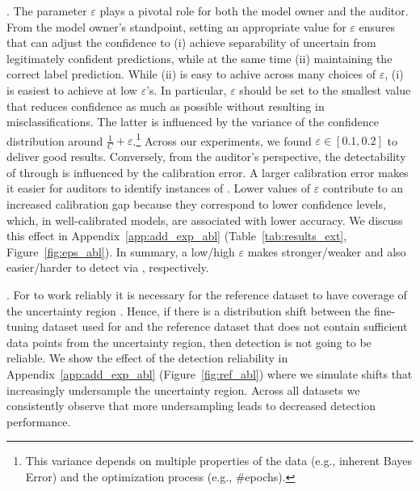 . The parameter $\varepsilon$ plays a pivotal role for both the model owner and the auditor. From the model owner's standpoint, setting an appropriate value for $\varepsilon$ ensures that \attack can adjust the confidence to (i) achieve separability of uncertain from legitimately confident predictions, while at the same time (ii) maintaining the correct label prediction. While (ii) is easy to achive across many choices of $\varepsilon$, (i) is easiest to achieve at low $\varepsilon$'s. In particular, $\varepsilon$ should be set to the smallest value that reduces confidence as much as possible without resulting in misclassifications. The latter is influenced by the variance of the confidence distribution around $\frac{1}{C} + \varepsilon$.\footnote{This variance depends on multiple properties of the data (e.g., inherent Bayes Error) and the optimization process (e.g., \#epochs).} Across our experiments, we found $\varepsilon \in [0.1,0.2]$ to deliver good results. Conversely, from the auditor's perspective, the detectability of \attack through \name is influenced by the calibration error. A larger calibration error makes it easier for auditors to identify instances of \attack. Lower values of $\varepsilon$ contribute to an increased calibration gap because they correspond to lower confidence levels, which, in well-calibrated models, are associated with lower accuracy. We discuss this effect in Appendix~\ref{app:add_exp_abl} (Table~\ref{tab:results_ext}, Figure~\ref{fig:eps_abl}). In summary, a low/high $\varepsilon$ makes \attack stronger/weaker and also easier/harder to detect via \name, respectively.


. For \name to work reliably it is necessary for the reference dataset to have coverage of the uncertainty region \uncertreg. Hence, if there is a distribution shift between the fine-tuning dataset used for \attack and the reference dataset that does not contain sufficient data points from the uncertainty region, then detection is not going to be reliable. We show the effect of the detection reliability in Appendix~\ref{app:add_exp_abl} (Figure~\ref{fig:ref_abl}) where we simulate shifts that increasingly undersample the uncertainty region. Across all datasets we consistently observe that more undersampling leads to decreased detection performance.

